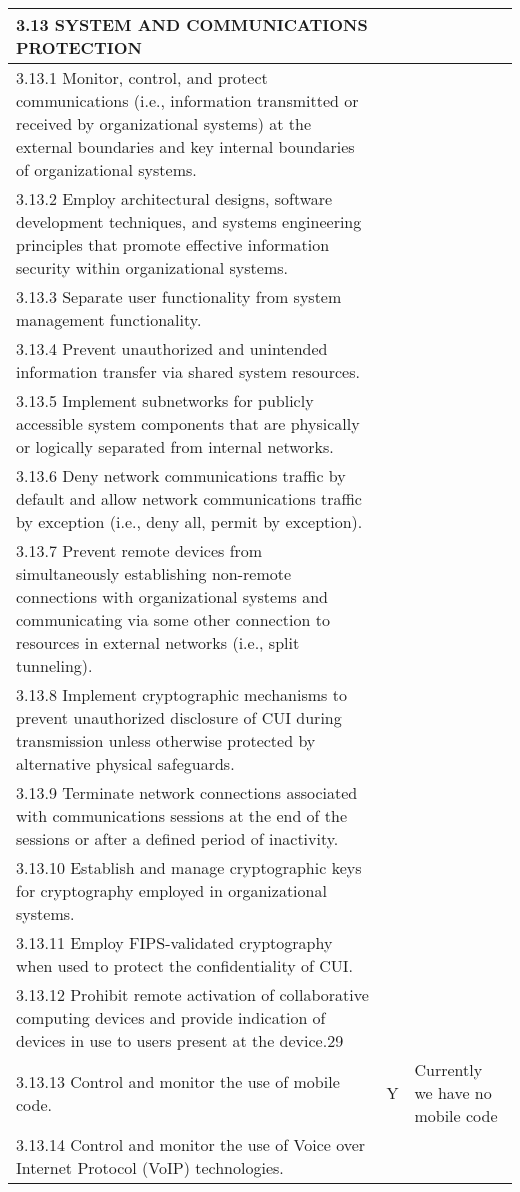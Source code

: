 \begin{longtable} {|p{}|p{}|p{} |}
{3.13 SYSTEM AND COMMUNICATIONS PROTECTION}&& \\ \hline
{3.13.1 Monitor, control, and protect communications (i.e., information transmitted or received by organizational systems) at the external boundaries and key internal boundaries of organizational systems.}&& \\ \hline
{3.13.2 Employ architectural designs, software development techniques, and systems engineering principles that promote effective information security within organizational systems.}&& \\ \hline
{3.13.3 Separate user functionality from system management functionality.}&& \\ \hline
{3.13.4 Prevent unauthorized and unintended information transfer via shared system resources.}&& \\ \hline
{3.13.5 Implement subnetworks for publicly accessible system components that are physically or logically separated from internal networks.}&& \\ \hline
{3.13.6 Deny network communications traffic by default and allow network communications traffic by exception (i.e., deny all, permit by exception).}&& \\ \hline
{3.13.7 Prevent remote devices from simultaneously establishing non-remote connections with organizational systems and communicating via some other connection to resources in external networks (i.e., split tunneling).}&& \\ \hline
{3.13.8 Implement cryptographic mechanisms to prevent unauthorized disclosure of CUI during transmission unless otherwise protected by alternative physical safeguards.}&& \\ \hline
{3.13.9 Terminate network connections associated with communications sessions at the end of the sessions or after a defined period of inactivity.}&& \\ \hline
{3.13.10 Establish and manage cryptographic keys for cryptography employed in organizational systems.}&& \\ \hline
{3.13.11 Employ FIPS-validated cryptography when used to protect the confidentiality of CUI.}&& \\ \hline
{3.13.12 Prohibit remote activation of collaborative computing devices and provide indication of devices in use to users present at the device.29}&& \\ \hline
{3.13.13 Control and monitor the use of mobile code.}&{Y}&{Currently we have no mobile code} \\ \hline
{3.13.14 Control and monitor the use of Voice over Internet Protocol (VoIP) technologies.}&& \\ \hline

\end{longtable}

